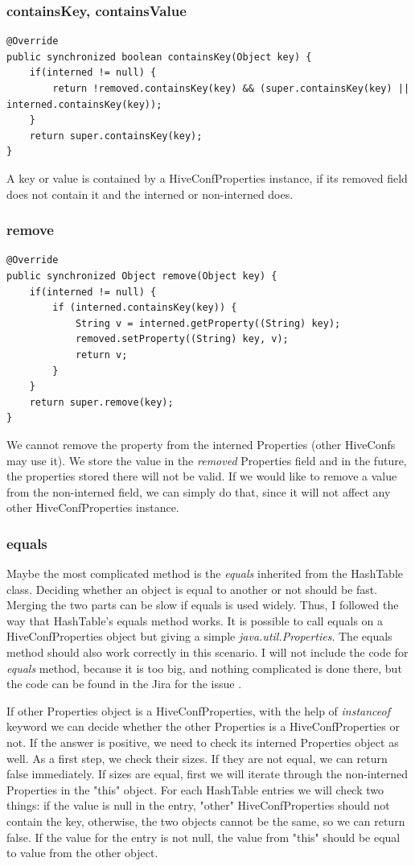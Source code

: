 \subsubsection{containsKey, containsValue}
\begin{lstlisting}
@Override
public synchronized boolean containsKey(Object key) {
	if(interned != null) {
		return !removed.containsKey(key) && (super.containsKey(key) || interned.containsKey(key));
	}
	return super.containsKey(key);
}
\end{lstlisting}
A key or value is contained by a HiveConfProperties instance, if its removed field does not contain it and the interned or non-interned does.

\subsubsection{remove}
\begin{lstlisting}
@Override
public synchronized Object remove(Object key) {
	if(interned != null) {
		if (interned.containsKey(key)) {	
			String v = interned.getProperty((String) key);
			removed.setProperty((String) key, v);
			return v;
		}
	}
	return super.remove(key);
}
\end{lstlisting}
We cannot remove the property from the interned Properties (other HiveConfs may use it). We store the value in the \textit{removed} Properties field and in the future, the properties stored there will not be valid. If we would like to remove a value from the non-interned field, we can simply do that, since it will not affect any other HiveConfProperties instance.

\subsubsection{equals}
Maybe the most complicated method is the \textit{equals} inherited from the HashTable class. Deciding whether an object is equal to another or not should be fast. Merging the two parts can be slow if equals is used widely. Thus, I followed the way that HashTable's equals method works. It is possible to call equals on a HiveConfProperties object but giving a simple \textit{java.util.Properties}. The equals method should also work correctly in this scenario. I will not include the code for \textit{equals} method, because it is too big, and nothing complicated is done there, but the code can be found in the Jira for the issue \cite{hive-conf}.

If other Properties object is a HiveConfProperties, with the help of \textit{instanceof} keyword we can decide whether the other Properties is a HiveConfProperties or not. If the answer is positive, we need to check its interned Properties object as well. As a first step, we check their sizes. If they are not equal, we can return false immediately. If sizes are equal, first we will iterate through the non-interned Properties in the "this" object. For each HashTable entries we will check two things: if the value is null in the entry, "other" HiveConfProperties should not contain the key, otherwise, the two objects cannot be the same, so we can return false. If the value for the entry is not null, the value from "this" should be equal to value from the other object. 

